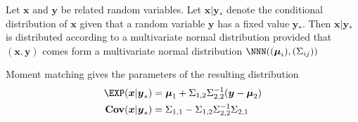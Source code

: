 \documentclass[landscape,footrule]{foils}
\renewcommand{\vec}[1]{\boldsymbol{#1}}
\newcommand{\COV}{\mathbf{Cov}}
\begin{document}
Let $\vec{x}$ and $\vec{y}$ be related random variables. 
Let $\vec{x}|\vec{y}_*$ denote the conditional distribution of $\vec{x}$ given that a random variable $\vec{y}$ has a fixed value $\vec{y}_*$.
Then $\vec{x}|\vec{y}_*$ is distributed according to a multivariate normal distribution provided that 
 $(\vec{x},\vec{y})$ comes form a multivariate normal distribution $\NNN((\vec{\mu}_i),(\Sigma_{ij}))$

\begin{triangles}
\item Moment matching gives the parameters of the resulting distribution 
\begin{align*}
\EXP(\vec{x}|\vec{y}_*)&= \vec{\mu}_1+ \Sigma_{1,2}\Sigma_{2,2}^{-1}(\vec{y}-\vec{\mu}_2)\\
\COV(\vec{x}|\vec{y}_*)&= \Sigma_{1,1}-\Sigma_{1,2}\Sigma_{2,2}^{-1}\Sigma_{2,1}\\
\end{align*}
\end{triangles}



\end{document}
